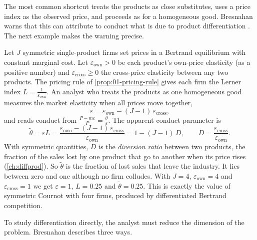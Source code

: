 The most common shortcut treats the products as close substitutes, uses a price index as the observed price, and
proceeds as for a homogeneous good. Bresnahan warns that this can attribute to conduct what is due to product
differentiation \citep[p.~1046]{Bresnahan1989}. The next example makes the warning precise.

\begin{example}\label{ex:01-index-conduct}
Let $J$ symmetric single-product firms set prices in a Bertrand equilibrium with constant marginal cost. Let
$\varepsilon_{\mathrm{own}} > 0$ be each product's own-price elasticity (as a positive number) and
$\varepsilon_{\mathrm{cross}} \ge 0$ the cross-price elasticity between any two products. The pricing rule of
\cref{prop:01-pricing-rule} gives each firm the Lerner index $L = \frac{1}{\varepsilon_{\mathrm{own}}}$. An analyst
who treats the products as one homogeneous good measures the market elasticity when all prices move together,
\begin{equation*}
\varepsilon = \varepsilon_{\mathrm{own}} - (J - 1)\,\varepsilon_{\mathrm{cross}} ,
\end{equation*}
and reads conduct from $\frac{P - mc}{P} = \frac{\theta}{\varepsilon}$. The apparent conduct parameter is
\begin{equation*}
\tilde\theta = \varepsilon L = \frac{\varepsilon_{\mathrm{own}} - (J - 1)\,\varepsilon_{\mathrm{cross}}}{\varepsilon_{\mathrm{own}}}
 = 1 - (J - 1)\,D, \qquad D = \frac{\varepsilon_{\mathrm{cross}}}{\varepsilon_{\mathrm{own}}} .
\end{equation*}
With symmetric quantities, $D$ is the \emph{diversion ratio} between two products, the fraction of the sales lost by one
product that go to another when its price rises (\cref{ch:diffprod}). So $\tilde\theta$ is the fraction of lost sales that leave
the industry. It lies between zero and one although no firm colludes. With $J = 4$, $\varepsilon_{\mathrm{own}} = 4$ and
$\varepsilon_{\mathrm{cross}} = 1$ we get $\varepsilon = 1$, $L = 0.25$ and $\tilde\theta = 0.25$. This is exactly the
value of symmetric Cournot with four firms, produced by differentiated Bertrand competition.
\end{example}

To study differentiation directly, the analyst must reduce the dimension of the problem. Bresnahan describes three ways.

